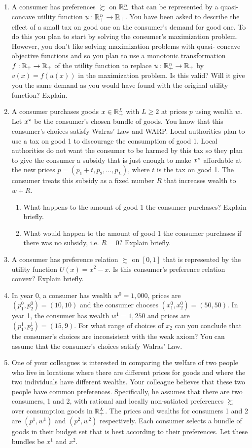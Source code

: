 \documentclass[12pt]{article}
\begin{document}
\begin{enumerate}
	\item A consumer has preferences $\succsim$ on $\mathbb{R}^n_+$ that can be represented by a quasi-concave utility function $u: \mathbb{R}^n_+ \to \mathbb{R}_+$. You have been asked to describe the effect of a small tax on good one on the consumer’s demand for good one. To do this you plan to start by solving the consumer’s maximization problem. However, you don’t like solving maximization problems with quasi- concave objective functions and so you plan to use a monotonic transformation $f: \mathbb{R}_+ \to \mathbb{R}_+$ of the utility function to replace $u:\mathbb{R}^n_+ \to \mathbb{R}_+$ by $v(x) = f(u(x))$ in the maximization problem. Is this valid? Will it give you the same demand as you would have found with the original utility function? Explain.
	\item A consumer purchases goods $x \in \mathbb{R}^L_+$ with $L \ge 2$ at prices $p$ using wealth $w$. Let $x^\star$ be the consumer's chosen bundle of goods. You know that this consumer's choices satisfy Walras' Law and WARP. Local authorities plan to use a tax on good 1 to discourage the consumption of good 1. Local authorities do not want the consumer to be harmed by this tax so they plan to give the consumer a subsidy that is just enough to make $x^\star$ affordable at the new prices $p = (p_1 + t,p_2,\dots,p_L)$, where $t$ is the tax on good 1. The consumer treats this subsidy as a fixed number $R$ that increases wealth to $w + R$.
	\begin{enumerate}
		\item What happens to the amount of good 1 the consumer purchases? Explain briefly.
		\item What would happen to the amount of good 1 the consumer purchases if there was no subsidy, i.e. $R=0$? Explain briefly.
	\end{enumerate}
	\item A consumer has preference relation $\succsim$ on $[0,1]$ that is represented by the utility function $U(x) = x^2 - x$. Is this consumer's preference relation convex? Explain briefly.
	\item In year 0, a consumer has wealth $w^0 = 1,000$, prices are $(p^0_1,p^0_2) = (10,10)$ and the consumer chooses $(x^0_1,x^0_2) = (50,50)$. In year 1, the consumer has wealth $w^1 = 1,250$ and prices are $(p^1_1,p^1_2) = (15,9)$. For what range of choices of $x_2$ can you conclude that the consumer's choices are inconsistent with the weak axiom? You can assume that the consumer's choices satisfy Walras' Law.
	\item One of your colleagues is interested in comparing the welfare of two people who live in locations where there are different prices for goods and where the two individuals have different wealths. Your colleague believes that these two people have common preferences. Specifically, he assumes that there are two consumers, 1 and 2, with rational and locally non-satiated preferences $\succsim$ over consumption goods in $\mathbb{R}^L_+$. The prices and wealths for consumers 1 and 2 are $(p^1,w^1)$ and $(p^2,w^2)$ respectively. Each consumer selects a bundle of goods in their budget set that is best according to their preferences. Let these bundles be $x^1$ and $x^2$.

\end{enumerate}
\end{document}
